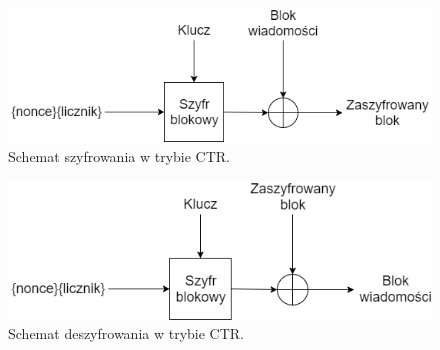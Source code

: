 \begin{figure}[t]
    \centering
	\includegraphics[width=\textwidth]{content/images/ctr-enc-scheme}
    \caption{Schemat szyfrowania w trybie CTR.}
    \label{ctr-enc}
\end{figure}
\begin{figure}[t]
    \centering
	\includegraphics[width=\textwidth]{content/images/ctr-dec-scheme}
    \caption{Schemat deszyfrowania w trybie CTR.}
    \label{ctr-dec}
\end{figure}

